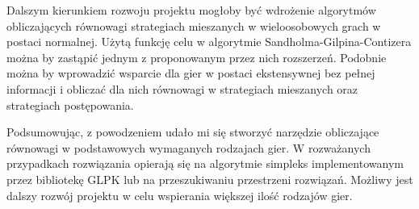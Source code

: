 \documentclass[polish]{standalone}
\begin{document}
Dalszym kierunkiem rozwoju projektu mogłoby być wdrożenie algorytmów obliczających równowagi strategiach mieszanych
w wieloosobowych grach w postaci normalnej. Użytą funkcję celu w algorytmie Sandholma-Gilpina-Contizera można
by zastąpić jednym z proponowanym przez nich rozszerzeń. Podobnie można by wprowadzić wsparcie dla gier w postaci
ekstensywnej bez pełnej informacji i obliczać dla nich równowagi w strategiach mieszanych oraz strategiach postępowania.

Podsumowując, z powodzeniem udało mi się stworzyć narzędzie obliczające równowagi w podstawowych wymaganych rodzajach
gier. W rozważanych przypadkach rozwiązania opierają się na algorytmie simpleks implementowanym przez bibliotekę GLPK
lub na przeszukiwaniu przestrzeni rozwiązań. Możliwy jest dalszy rozwój projektu w celu wspierania większej ilość 
rodzajów gier.
\end{document}
